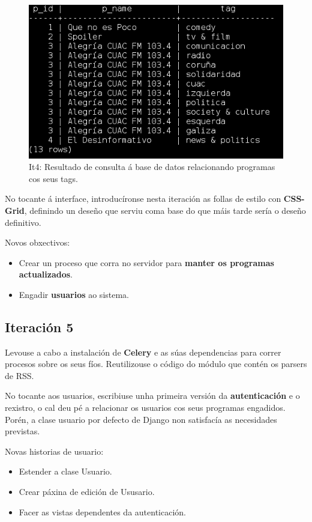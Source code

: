 \begin{figure}[h]
	\centering
	\includegraphics[scale=0.6,keepaspectratio=true]{./images/tags.png}
	\caption{It4: Resultado de consulta á base de datos relacionando programas cos seus tags.}
	\label{fig:it4_tag}
\end{figure}

No tocante á interface, introducíronse nesta iteración as follas de estilo con \textbf{CSS-Grid}, definindo un deseño que serviu coma base do que máis tarde sería o deseño definitivo.

Novos obxectivos:

\begin{itemize}
	\item Crear un proceso que corra no servidor para \textbf{manter os programas actualizados}.
	\item Engadir \textbf{usuarios} ao sistema. 
\end{itemize}

\subsection{Iteración 5}

Levouse a cabo a instalación de \textbf{Celery} e as súas dependencias para correr procesos sobre os seus fíos. Reutilizouse o código do módulo que contén os parsers de RSS. 

No tocante aos usuarios, escribiuse unha primeira versión da \textbf{autenticación} e o rexistro, o cal deu pé a relacionar os usuarios cos seus programas engadidos. Porén, a clase usuario por defecto de Django non satisfacía as necesidades previstas.

Novas historias de usuario:

\begin{itemize}
	\item Estender a clase Usuario.
	\item Crear páxina de edición de Ususario.
	\item Facer as vistas dependentes da autenticación.
\end{itemize}

